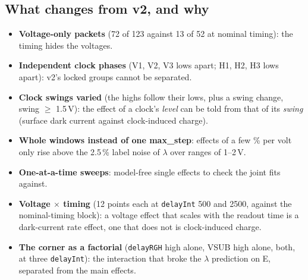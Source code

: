 \documentclass[11pt]{article}
\begin{document}
\subsection{What changes from v2, and why}
\begin{itemize}
\item \textbf{Voltage-only packets} (72 of 123 against 13 of 52 at nominal timing): the timing hides the voltages.
\item \textbf{Independent clock phases} (V1, V2, V3 lows apart; H1, H2, H3 lows apart): v2's locked groups cannot be
  separated.
\item \textbf{Clock swings varied} (the highs follow their lows, plus a swing change, swing $\geq$ 1.5\,V): the effect of
  a clock's \emph{level} can be told from that of its \emph{swing} (surface dark current against clock-induced charge).
\item \textbf{Whole windows instead of one max\_step}: effects of a few \% per volt only rise above the 2.5\,\% label
  noise of $\lambda$ over ranges of 1--2\,V.
\item \textbf{One-at-a-time sweeps}: model-free single effects to check the joint fits against.
\item \textbf{Voltage $\times$ timing} (12 points each at \texttt{delayInt} 500 and 2500, against the nominal-timing
  block): a voltage effect that scales with the readout time is a dark-current rate effect, one that does not is
  clock-induced charge.
\item \textbf{The corner as a factorial} (\texttt{delayRGH} high alone, VSUB high alone, both, at three
  \texttt{delayInt}): the interaction that broke the $\lambda$ prediction on E, separated from the main effects.
\end{itemize}
\end{document}
